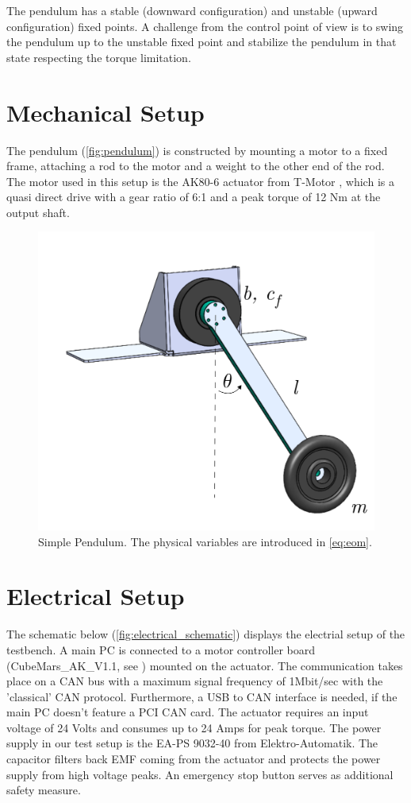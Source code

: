 \documentclass[onecolumn, letter paper]{report}
\begin{document}
The pendulum has a stable (downward configuration) and unstable (upward configuration) fixed points. A challenge from the control point of view is to swing the pendulum up to the unstable fixed point and stabilize the pendulum in that state respecting the torque limitation.

\chapter{Mechanical Setup}

The pendulum (\autoref{fig:pendulum}) is constructed by mounting a motor to a fixed frame, attaching a rod to the motor and a weight to the other end of the rod. The motor used in this setup is the AK80-6 actuator from T-Motor \autocite{tmotors_manual}, which is a quasi direct drive with a gear ratio of 6:1 and a peak torque of 12 Nm at the output shaft.

\begin{figure}[H]
    \centering
    \includegraphics[width=0.4\linewidth]{figures/simple_pendulum_CAD.png}
    \caption{Simple Pendulum. The physical variables are introduced in \autoref{eq:eom}.}
    \label{fig:pendulum}
\end{figure}

\chapter{Electrical Setup}

The schematic below (\autoref{fig:electrical_schematic}) displays the electrial setup of the testbench. A main PC is connected to a motor controller board (CubeMars\_AK\_V1.1, see \cite{tmotors_manual}) mounted on the actuator. The communication takes place on a CAN bus with a maximum signal frequency of 1Mbit/sec with the 'classical' CAN protocol. Furthermore, a USB to CAN interface is needed, if the main PC doesn't feature a PCI CAN card. The actuator requires an input voltage of 24 Volts and consumes up to 24 Amps for peak torque. The power supply in our test setup is the EA-PS 9032-40 from Elektro-Automatik. The capacitor filters back EMF coming from the actuator and protects the power supply from high voltage peaks. An emergency stop button serves as additional safety measure.
\end{document}

